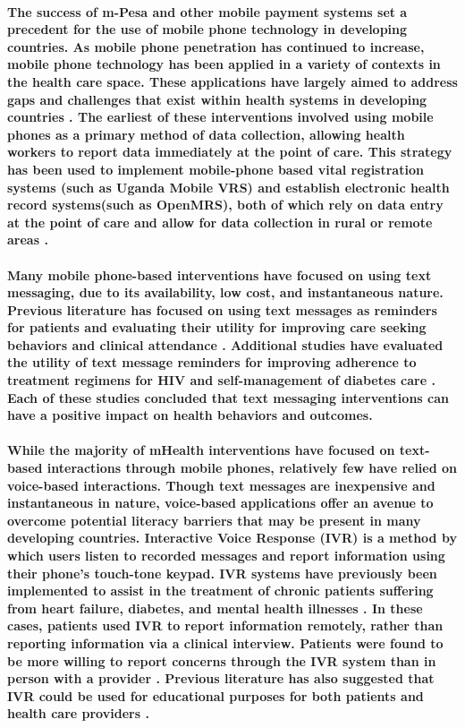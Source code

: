 \paragraph{The success of m-Pesa and other mobile payment systems set a precedent for the use of mobile phone technology in developing countries. As mobile phone penetration has continued to increase, mobile phone technology has been applied in a variety of contexts in the health care space. These applications have largely aimed to address gaps and challenges that exist within health systems in developing countries \citep{Labrique2013}. The earliest of these interventions involved using mobile phones as a primary method of data collection, allowing health workers to report data immediately at the point of care. This strategy has been used to implement mobile-phone based vital registration systems (such as Uganda Mobile VRS) and establish electronic health record systems(such as OpenMRS), both of which rely on data entry at the point of care and allow for data collection in rural or remote areas \citep{Labrique2013}.}

\paragraph{Many mobile phone-based interventions have focused on using text messaging, due to its availability, low cost, and instantaneous nature.  Previous literature has focused on using text messages as reminders for patients and evaluating their utility for improving care seeking behaviors \citep{ColeLewis2010} and clinical attendance \citep{Guy2012}. Additional studies have evaluated the utility of text message reminders for improving adherence to treatment regimens for HIV \citep{Horvath2012} and self-management of diabetes care \citep{Krishna2008}. Each of these studies concluded that text messaging interventions can have a positive impact on health behaviors and outcomes.}

\paragraph{While the majority of mHealth interventions have focused on text-based interactions through mobile phones, relatively few have relied on voice-based interactions. Though text messages are inexpensive and instantaneous in nature, voice-based applications offer an avenue to overcome potential literacy barriers that may be present in many developing countries. Interactive Voice Response (IVR) is a method by which users listen to recorded messages and report information using their phone's touch-tone keypad. IVR systems have  previously been implemented to assist in the treatment of chronic patients suffering from heart failure, diabetes, and mental health illnesses \citep{Piette2000}. In these cases, patients used IVR to report information remotely, rather than reporting information via a clinical interview. Patients were found to be more willing to report concerns through the IVR system than in person with a provider \citep{Piette2000}. Previous literature has also suggested that IVR could be used for educational purposes for both patients and health care providers \citep{Labrique2013, Lee2003}.}

